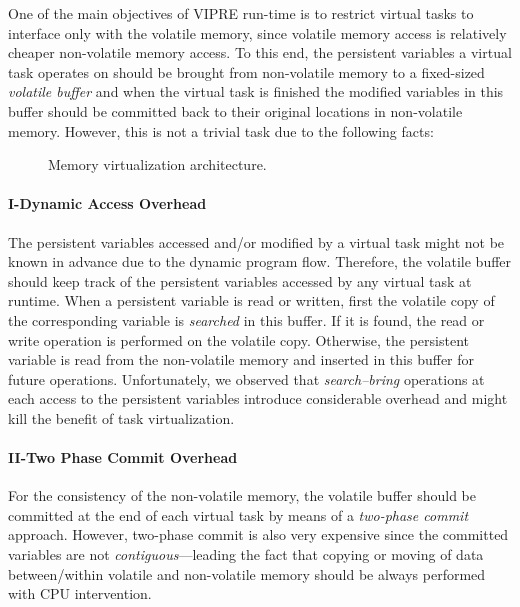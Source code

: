 One of the main objectives of VIPRE run-time is to restrict virtual tasks to interface only with the volatile memory, since volatile memory access is relatively cheaper non-volatile memory access. To this end, the persistent variables a virtual task operates on should be brought from non-volatile memory to a fixed-sized \emph{volatile buffer} and when the virtual task is finished the modified variables in this buffer should be committed back to their original locations in non-volatile memory. However, this is not a trivial task due to the following facts: 

\begin{figure}
	\centering
	\caption{Memory virtualization architecture.}
	\label{fig:}
\end{figure}

\paragraph{I-Dynamic Access Overhead} The persistent variables accessed and/or modified by a virtual task might not be known in advance due to the dynamic program flow. Therefore, the  volatile buffer should keep track of the persistent variables accessed by any virtual task at runtime. When a persistent variable is read or written, first the volatile copy of the corresponding variable is \emph{searched} in this buffer. If it is found, the read or write operation is performed on the volatile copy. Otherwise, the persistent variable is read from the non-volatile memory and inserted in this buffer for future operations. Unfortunately, we observed that \emph{search--bring} operations at each access to the persistent variables introduce considerable overhead and might kill the benefit of task virtualization.
 
\paragraph{II-Two Phase Commit Overhead}  For the consistency of the non-volatile memory, the volatile buffer should be committed at the end of each virtual task by means of a \emph{two-phase commit} approach.  However, two-phase commit is also very expensive since the committed variables are not \emph{contiguous}---leading the fact that copying or moving of data between/within volatile and non-volatile memory should be always performed with CPU intervention. 


